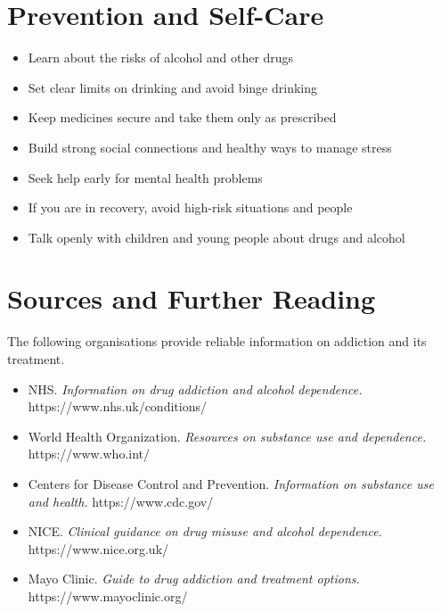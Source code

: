 \section*{Prevention and Self-Care}
\begin{itemize}
    \item Learn about the risks of alcohol and other drugs
    \item Set clear limits on drinking and avoid binge drinking
    \item Keep medicines secure and take them only as prescribed
    \item Build strong social connections and healthy ways to manage stress
    \item Seek help early for mental health problems
    \item If you are in recovery, avoid high-risk situations and people
    \item Talk openly with children and young people about drugs and alcohol
\end{itemize}

\section*{Sources and Further Reading}
The following organisations provide reliable information on addiction and its treatment.

\begin{itemize}
    \item NHS. \textit{Information on drug addiction and alcohol dependence.} https://www.nhs.uk/conditions/
    \item World Health Organization. \textit{Resources on substance use and dependence.} https://www.who.int/
    \item Centers for Disease Control and Prevention. \textit{Information on substance use and health.} https://www.cdc.gov/
    \item NICE. \textit{Clinical guidance on drug misuse and alcohol dependence.} https://www.nice.org.uk/
    \item Mayo Clinic. \textit{Guide to drug addiction and treatment options.} https://www.mayoclinic.org/
\end{itemize}
